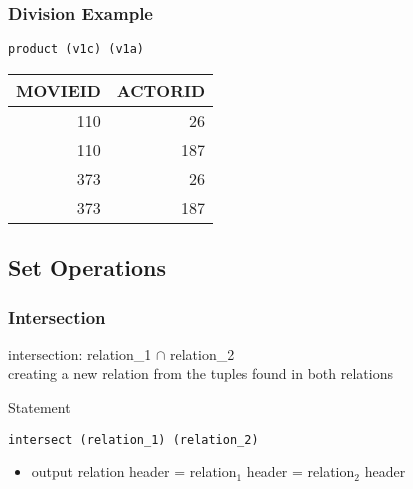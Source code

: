 \documentclass[dvipsnames]{beamer}
\theoremstyle{plain}
\begin{document}
\begin{frame}[fragile]
  \frametitle{Division Example}

  \begin{example}
    \begin{lstlisting}
product (v1c) (v1a)
    \end{lstlisting}

    \pause
    \begin{tiny}
    \begin{table}
      \begin{tabular}{|r|r|}\hline
MOVIEID &  ACTORID\\\hline\hline
    110 &       26\\\hline
    110 &      187\\\hline
    373 &       26\\\hline
    373 &      187\\\hline
      \end{tabular}
    \end{table}
    \end{tiny}
  \end{example}
\end{frame}

\subsection{Set Operations}

\begin{frame}[fragile]
  \frametitle{Intersection}

  \begin{definition}
    \alert{intersection}: relation\_1 $\cap$ relation\_2\\
      creating a new relation from the tuples found in both relations
  \end{definition}

  \pause
  \begin{block}{Statement}
    \begin{lstlisting}
intersect (relation_1) (relation_2)
    \end{lstlisting}
  \end{block}

  \pause
  \begin{itemize}
    \item output relation header = relation$_1$ header = relation$_2$ header
  \end{itemize}
\end{frame}
\end{document}
